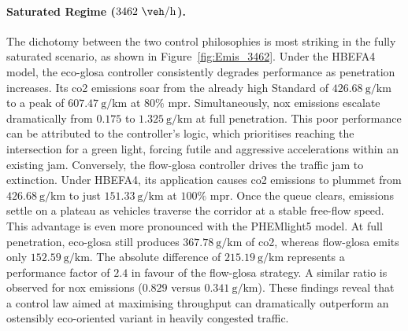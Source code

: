 \paragraph{Saturated Regime ($3462~\unit{\veh\per\hour}$).}
The dichotomy between the two control philosophies is most striking in the fully saturated scenario, as shown in Figure~\vref{fig:Emis_3462}. Under the HBEFA4 model, the \ac{eco-glosa} controller consistently degrades performance as penetration increases. Its \ac{co2} emissions soar from the already high Standard of $426.68~\unit{\gram\per\kilo\metre}$ to a peak of $607.47~\unit{\gram\per\kilo\metre}$ at $80\%$ \ac{mpr}. Simultaneously, \ac{nox} emissions escalate dramatically from $0.175$ to $1.325~\unit{\gram\per\kilo\metre}$ at full penetration. This poor performance can be attributed to the controller's logic, which prioritises reaching the intersection for a green light, forcing futile and aggressive accelerations within an existing jam.
\mynewline
Conversely, the \ac{flow-glosa} controller drives the traffic jam to extinction. Under HBEFA4, its application causes \ac{co2} emissions to plummet from $426.68~\unit{\gram\per\kilo\metre}$ to just $151.33~\unit{\gram\per\kilo\metre}$ at $100\%$ \ac{mpr}. Once the queue clears, emissions settle on a plateau as vehicles traverse the corridor at a stable free-flow speed. This advantage is even more pronounced with the PHEMlight5 model. At full penetration, \ac{eco-glosa} still produces $367.78~\unit{\gram\per\kilo\metre}$ of \ac{co2}, whereas \ac{flow-glosa} emits only $152.59~\unit{\gram\per\kilo\metre}$. The absolute difference of $215.19~\unit{\gram\per\kilo\metre}$ represents a performance factor of $2.4$ in favour of the \ac{flow-glosa} strategy. A similar ratio is observed for \ac{nox} emissions ($0.829$ versus $0.341~\unit{\gram\per\kilo\metre}$). These findings reveal that a control law aimed at maximising throughput can dramatically outperform an ostensibly eco-oriented variant in heavily congested traffic.

